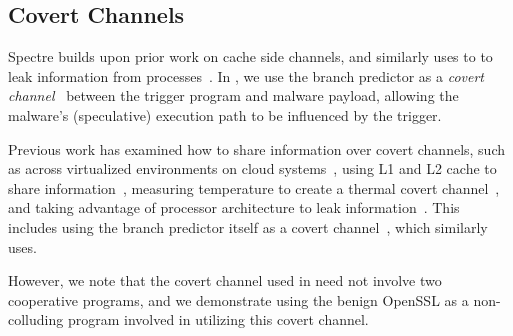 \subsection{Covert Channels}

Spectre builds upon prior work on cache side channels, and similarly uses to to
leak information from
processes~\cite{percival2005cache,zhang2012cross,osvik2006cache}. In \speculake,
we use the branch predictor as a \emph{covert channel}~\cite{lampson1973note}
between the trigger program and malware payload, allowing the malware's
(speculative) execution path to be influenced by the trigger.

Previous work has examined how to share information over covert
channels, such as across virtualized environments on cloud
systems~\cite{wu2012whispers}, using L1 and L2 cache to share
information~\cite{percival2005cache}, measuring temperature to create a thermal
covert channel~\cite{masti2015thermal, bartolini2016capacity}, and taking
advantage of processor architecture to leak information~\cite{wang2006covert}.
This includes using the branch predictor itself as a covert
channel~\cite{evtyushkin2016understanding,evtyushkin2015covert}, which
\speculake similarly uses.

However, we note that the covert channel used in \speculake need not involve two
cooperative programs, and we demonstrate using the benign OpenSSL as a
non-colluding program involved in utilizing this covert channel.




